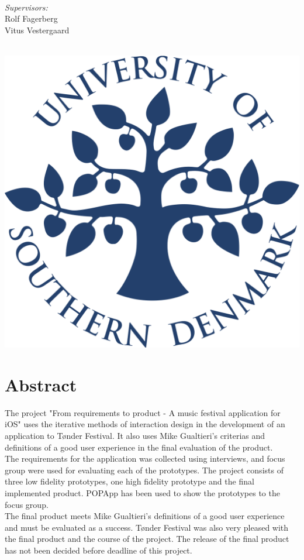 \documentclass[a4paper,10pt,titlepage]{article}
\begin{document}
\begin{titlepage}
\begin{minipage}{0.3\textwidth}
\begin{flushleft}
\end{flushleft}
\end{minipage}
~
\begin{minipage}{0.4\textwidth}
\begin{flushright} \large
\vspace{0.5cm}
\emph{Supervisors:} \\
Rolf Fagerberg\\
Vitus Vestergaard
\end{flushright}
\end{minipage}\\[4cm]
\includegraphics[scale=0.3]{Billeder/logo.png}
\vfill %

\end{titlepage}

\tableofcontents
\vfill
\section*{Abstract}
The project "From requirements to product - A music festival application for iOS" uses the iterative methods of interaction design in the development of an application to Tønder Festival. It also uses Mike Gualtieri's criterias and definitions of a good user experience in the final evaluation of the product.\\
The requirements for the application was collected using interviews, and focus group were used for evaluating each of the prototypes. The project consists of three low fidelity prototypes, one high fidelity prototype and the final implemented product. POPApp has been used to show the prototypes to the focus group.\\ 
The final product meets Mike Gualtieri's definitions of a good user experience and must be evaluated as a success. Tønder Festival was also very pleased with the final product and the course of the project. The release of the final product has not been decided before deadline of this project.
\newpage
\end{document}
